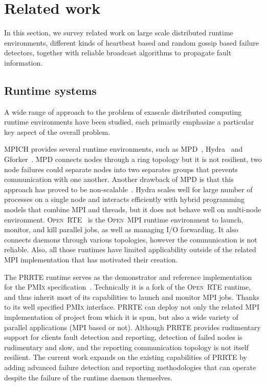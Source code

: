 \documentclass[sigconf]{acmart}
\newcommand{\prrte}[0]{\textsc{PRRTE}\xspace}
\newcommand{\pmix}[0]{\textsc{PMIx}\xspace}
\newcommand{\orte}[0]{\textsc{Open~RTE}\xspace}
\newcommand{\ompi}[0]{\textsc{Open~MPI}\xspace}
\newcommand{\mpi}[0]{\textsc{MPI}\xspace}
\begin{document}
\section{Related work}\label{sec:related}
In this section, we survey related work on large scale distributed runtime environments, different kinds of heartbeat based and random gossip based failure detectors, together with reliable broadcast algorithms to propagate fault information.

\subsection{Runtime systems}
A wide range of approach to the problem of exascale distributed computing runtime environments have been studied, each primarily emphasize a particular key aspect of the overall problem. 

MPICH provides several runtime environments, such as MPD~\cite{Butler00}, Hydra~\cite{MPICH14} and Gforker~\cite{MPICH14}. MPD connects nodes through a ring topology but it is not resilient, two node failures could separate nodes into two separates groups that prevents communication with one another. Another drawback of MPD is that this approach has proved to be non-scalable~\cite{Bosilca11}.
Hydra scales well for large number of processes on a single node and interacts efficiently with hybrid programming models that combine \mpi and threads, but it does not behave well on multi-node environment. \orte~\cite{Castain05, Jeffrey12} is the \ompi runtime environment to launch, monitor, and kill parallel jobs, as well as managing I/O forwarding. It also connects daemons through various topologies, however the communication is not reliable. Also, all those runtimes have limited applicability outside of the related \mpi implementation 
that has motivated their creation. 

The \prrte runtime serves as the demonstrator and reference implementation
for the \pmix specification~\cite{CASTAIN18}. Technically it is a fork of
the \orte runtime, and thus inherit most of its capabilities to launch
and monitor \mpi jobs. Thanks to its well specified \pmix interface. \prrte
can deploy not only the related \mpi implementation of project from which it
is spun, but also a wide variety of parallel applications (MPI based or not).
Although \prrte provides rudimentary support for clients fault detection and reporting, 
detection of failed nodes is rudimentary and slow, and the reporting 
communication topology is not itself resilient. 
The current work expands on the existing capabilities of \prrte by adding
advanced failure detection and reporting methodologies that can operate 
despite the failure of the runtime daemon themselves.
\end{document}
